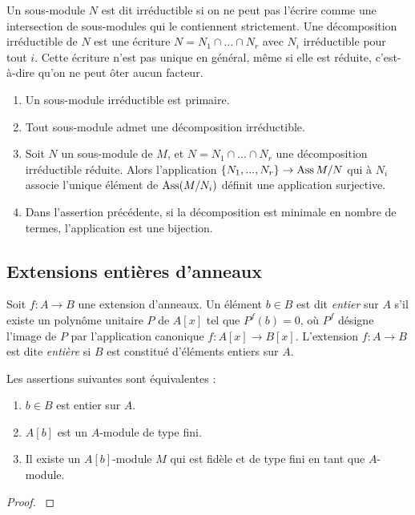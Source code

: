 Un sous-module $N$ est dit irréductible si on ne peut pas l'écrire comme une intersection de sous-modules qui le contiennent strictement. Une décomposition irréductible de $N$ est une écriture $N=N_1\cap...\cap N_r$ avec $N_i$ irréductible pour tout $i$. Cette écriture n'est pas unique en général, même si elle est réduite, c'est-à-dire qu'on ne peut ôter aucun facteur. 

\begin{thm}
\begin{enumerate}
\item Un sous-module irréductible est primaire.
\item Tout sous-module admet une décomposition irréductible.
\item Soit $N$ un sous-module de $M$, et $N=N_1\cap...\cap N_r$ une décomposition irréductible réduite. Alors l'application $\lbrace N_1,...,N_r\rbrace\rightarrow \operatorname{Ass} M/N$ qui à $N_i$ associe l'unique élément de $ \operatorname{Ass}(M/N_i)$ définit une application surjective.
\item Dans l'assertion précédente, si la décomposition est minimale en nombre de termes, l'application est une bijection.
\end{enumerate}
\end{thm}

\subsection{Extensions entières d'anneaux}

Soit $f:A\rightarrow B$ une extension d'anneaux. Un élément $b\in B$ est dit \textit{entier} sur $A$ s'il existe un polynôme unitaire $P$ de $A[x]$ tel que $P^f(b)=0$, où $P^f$ désigne l'image de $P$ par l'application canonique $f:A[x]\rightarrow B[x]$. L'extension $f:A\rightarrow B$ est dite \textit{entière} si $B$ est constitué d'éléments entiers sur $A$.

\begin{prop}
Les assertions suivantes sont équivalentes :
\begin{enumerate}
\item $b\in B$ est entier sur $A$.
\item $A[b]$ est un $A$-module de type fini.
\item Il existe un $A[b]$-module $M$ qui est fidèle et de type fini en tant que $A$-module.
\end{enumerate}
\end{prop}
\begin{proof}
\cite[5.1]{atiyahmacdo}
\end{proof}

